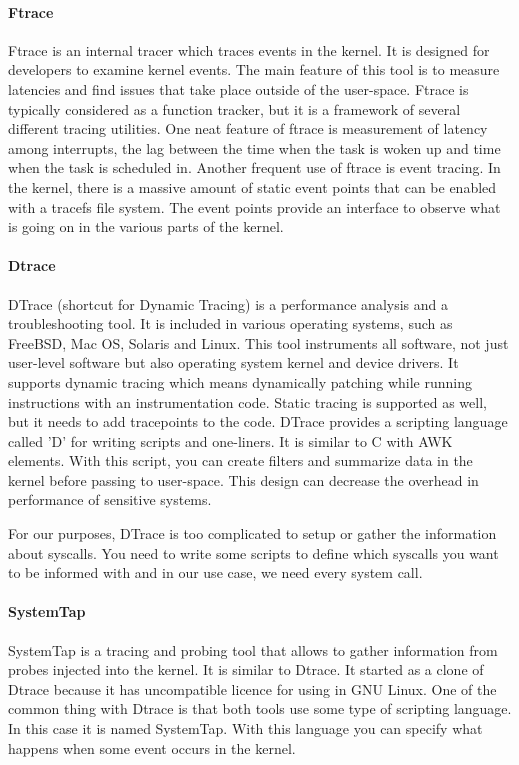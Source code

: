 \paragraph{Ftrace}
Ftrace \cite{ftrace_man} is an internal tracer which traces events in the kernel.
It is designed for developers to examine kernel events.
The main feature of this tool is to measure latencies and find issues that take place outside of the user-space.
Ftrace is typically considered as a function tracker,
but it is a framework of several different tracing utilities.
One neat feature of ftrace is measurement of latency among interrupts, the lag between the time when the task is woken up and time when the task is scheduled in.
Another frequent use of ftrace is event tracing.
In the kernel, there is a massive amount of static event points that can be enabled with a tracefs file system.
The event points provide an interface to observe what is going on in the various parts of the kernel.

\paragraph{Dtrace}
DTrace \cite{dtrace_man, dtrace_about} (shortcut for Dynamic Tracing) is a performance analysis and a troubleshooting tool.
It is included in various operating systems, such as FreeBSD, Mac OS, Solaris and Linux.
This tool instruments all software, not just user-level software but also operating system kernel and device drivers.
It supports dynamic tracing which means dynamically patching while running instructions with an instrumentation code.
Static tracing is supported as well, but it needs to add tracepoints to the code.
DTrace provides a scripting language called 'D' for writing scripts and one-liners.
It is similar to C with AWK elements.
With this script, you can create filters and summarize data in the kernel before passing to user-space.
This design can decrease the overhead in performance of  sensitive systems.

For our purposes, DTrace is too complicated to setup or gather the information about syscalls.
You need to write some scripts to define which syscalls you want to be informed with and in our use case, we need every system call.

\paragraph{SystemTap}
SystemTap \cite{systemtap} is a tracing and probing tool that allows to gather information from probes injected into the kernel.
It is similar to Dtrace.
It started as a clone of Dtrace because it has uncompatible licence for using in GNU Linux.
One of the common thing with Dtrace is that both tools use some type of scripting language.
In this case it is named SystemTap.
With this language you can specify what happens when some event occurs in the kernel.

